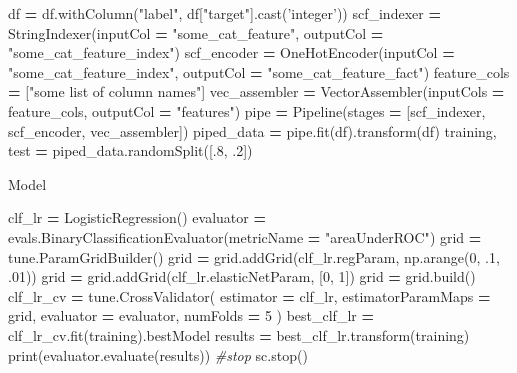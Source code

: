 \documentclass[]{book}
\newenvironment{Shaded}{\begin{snugshade}}{\end{snugshade}}
\newcommand{\DecValTok}[1]{\textcolor[rgb]{0.00,0.00,0.81}{#1}}
\newcommand{\StringTok}[1]{\textcolor[rgb]{0.31,0.60,0.02}{#1}}
\newcommand{\CommentTok}[1]{\textcolor[rgb]{0.56,0.35,0.01}{\textit{#1}}}
\newcommand{\OperatorTok}[1]{\textcolor[rgb]{0.81,0.36,0.00}{\textbf{#1}}}
\newcommand{\BuiltInTok}[1]{#1}
\newcommand{\NormalTok}[1]{#1}
\theoremstyle{definition}
\theoremstyle{definition}
\theoremstyle{definition}
\theoremstyle{remark}
\begin{document}
\begin{Shaded}
\begin{Highlighting}[]
\NormalTok{df }\OperatorTok{=}\NormalTok{ df.withColumn(}\StringTok{"label"}\NormalTok{, df[}\StringTok{"target"}\NormalTok{].cast(}\StringTok{'integer'}\NormalTok{))}
\NormalTok{scf_indexer }\OperatorTok{=}\NormalTok{ StringIndexer(inputCol }\OperatorTok{=} \StringTok{"some_cat_feature"}\NormalTok{, outputCol }\OperatorTok{=} \StringTok{"some_cat_feature_index"}\NormalTok{)}
\NormalTok{scf_encoder }\OperatorTok{=}\NormalTok{ OneHotEncoder(inputCol }\OperatorTok{=} \StringTok{"some_cat_feature_index"}\NormalTok{, outputCol }\OperatorTok{=} \StringTok{"some_cat_feature_fact"}\NormalTok{)}
\NormalTok{feature_cols }\OperatorTok{=}\NormalTok{ [}\StringTok{"some list of column names"}\NormalTok{]}
\NormalTok{vec_assembler }\OperatorTok{=}\NormalTok{ VectorAssembler(inputCols }\OperatorTok{=}\NormalTok{ feature_cols, }
\NormalTok{                                outputCol }\OperatorTok{=} \StringTok{"features"}\NormalTok{)}
\NormalTok{pipe }\OperatorTok{=}\NormalTok{ Pipeline(stages }\OperatorTok{=}\NormalTok{ [scf_indexer, scf_encoder, vec_assembler])}
\NormalTok{piped_data }\OperatorTok{=}\NormalTok{ pipe.fit(df).transform(df)}
\NormalTok{training, test }\OperatorTok{=}\NormalTok{ piped_data.randomSplit([.}\DecValTok{8}\NormalTok{, .}\DecValTok{2}\NormalTok{])}
\end{Highlighting}
\end{Shaded}

Model

\begin{Shaded}
\begin{Highlighting}[]
\NormalTok{clf_lr }\OperatorTok{=}\NormalTok{ LogisticRegression()}
\NormalTok{evaluator }\OperatorTok{=}\NormalTok{ evals.BinaryClassificationEvaluator(metricName }\OperatorTok{=} \StringTok{"areaUnderROC"}\NormalTok{)}
\NormalTok{grid }\OperatorTok{=}\NormalTok{ tune.ParamGridBuilder()}
\NormalTok{grid }\OperatorTok{=}\NormalTok{ grid.addGrid(clf_lr.regParam, np.arange(}\DecValTok{0}\NormalTok{, .}\DecValTok{1}\NormalTok{, .}\DecValTok{01}\NormalTok{))}
\NormalTok{grid }\OperatorTok{=}\NormalTok{ grid.addGrid(clf_lr.elasticNetParam, [}\DecValTok{0}\NormalTok{, }\DecValTok{1}\NormalTok{])}
\NormalTok{grid }\OperatorTok{=}\NormalTok{ grid.build()}
\NormalTok{clf_lr_cv }\OperatorTok{=}\NormalTok{ tune.CrossValidator(}
\NormalTok{    estimator }\OperatorTok{=}\NormalTok{ clf_lr,}
\NormalTok{    estimatorParamMaps }\OperatorTok{=}\NormalTok{ grid,}
\NormalTok{    evaluator }\OperatorTok{=}\NormalTok{ evaluator,}
\NormalTok{    numFolds }\OperatorTok{=} \DecValTok{5}
\NormalTok{               )}
\NormalTok{best_clf_lr }\OperatorTok{=}\NormalTok{ clf_lr_cv.fit(training).bestModel}
\NormalTok{results }\OperatorTok{=}\NormalTok{ best_clf_lr.transform(training)}
\BuiltInTok{print}\NormalTok{(evaluator.evaluate(results))}
\CommentTok{#stop}
\NormalTok{sc.stop()}
\end{Highlighting}
\end{Shaded}
\end{document}
